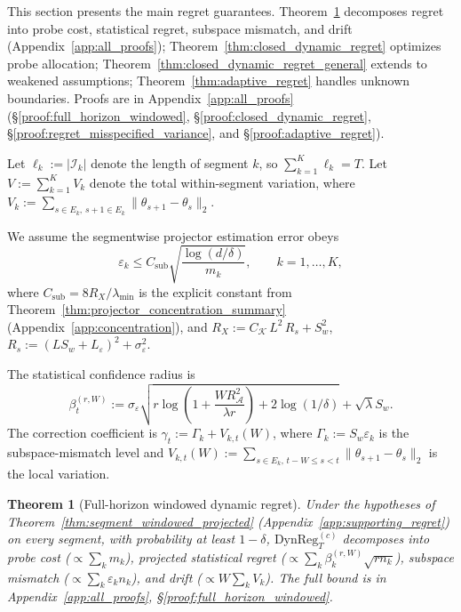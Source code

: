 \documentclass{article}
\newcommand{\cA}{\mathcal{A}}
\newcommand{\cI}{\mathcal{I}}
\newcommand{\DynReg}{\mathrm{DynReg}}
\newtheorem{theorem}{Theorem}
\begin{document}
  This section presents the main regret guarantees. Theorem~\ref{thm:full_horizon_windowed} decomposes regret into probe cost,
  statistical regret, subspace mismatch, and drift (Appendix~\ref{app:all_proofs}); Theorem~\ref{thm:closed_dynamic_regret} optimizes
   probe allocation; Theorem~\ref{thm:closed_dynamic_regret_general} extends to weakened assumptions;
  Theorem~\ref{thm:adaptive_regret} handles unknown boundaries.
Proofs are in Appendix~\ref{app:all_proofs} (\S\ref{proof:full_horizon_windowed}, \S\ref{proof:closed_dynamic_regret},
  \S\ref{proof:regret_misspecified_variance}, and \S\ref{proof:adaptive_regret}).


  Let $\ell_k := |\cI_k|$ denote the length of segment $k$, so $\sum_{k=1}^K \ell_k = T$.
  Let $V := \sum_{k=1}^K V_k$ denote the total within-segment variation, where $V_k := \sum_{s\in E_k,\,s+1\in
  E_k}\|\theta_{s+1}-\theta_s\|_2$.

  We assume the segmentwise projector estimation error obeys
  \begin{equation}
  \varepsilon_k \le C_{\mathrm{sub}} \sqrt{\frac{\log(d/\delta)}{m_k}},
  \qquad k=1,\dots,K,
  \label{eq:eps_k_rate}
  \end{equation}
  where $C_{\mathrm{sub}} = 8R_X/\lambda_{\min}$ is the explicit constant from Theorem~\ref{thm:projector_concentration_summary}
  (Appendix~\ref{app:concentration}), and $R_X := C_{\mathcal K}\,L^2\,R_s + S_w^2$, $R_s := (LS_w + L_\varepsilon)^2 +
  \sigma_\varepsilon^2$.

  The statistical confidence radius is
  \begin{equation}
  \beta_t^{(r,W)} := \sigma_\varepsilon
  \sqrt{r \log\!\left(1+\frac{W R_{\cA}^2}{\lambda r}\right) + 2\log(1/\delta)} + \sqrt{\lambda}S_w.
  \label{eq:beta_rW}
  \end{equation}
  The correction coefficient is $\gamma_t := \Gamma_k + V_{k,t}(W)$, where $\Gamma_k := S_w \varepsilon_k$ is the subspace-mismatch
  level and $V_{k,t}(W) := \sum_{s\in E_k,\, t-W \le s < t}\|\theta_{s+1}-\theta_s\|_2$ is the local variation.

    \begin{theorem}[Full-horizon windowed dynamic regret]
    \label{thm:full_horizon_windowed}
    Under the hypotheses of Theorem~\ref{thm:segment_windowed_projected} (Appendix~\ref{app:supporting_regret}) on every segment,
  with
    probability at least $1-\delta$, $\DynReg_T^{(c)}$ decomposes into probe cost ($\propto \sum_k m_k$), projected statistical
  regret
    ($\propto \sum_k \beta_k^{(r,W)}\sqrt{rn_k}$), subspace mismatch ($\propto \sum_k \varepsilon_k n_k$), and drift ($\propto
  W\sum_k
    V_k$). The full bound is in Appendix~\ref{app:all_proofs}, \S\ref{proof:full_horizon_windowed}.
    \end{theorem}
\end{document}
